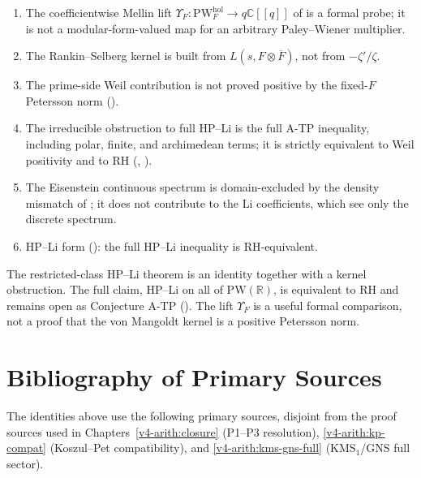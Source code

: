 \begin{enumerate}
\item The coefficientwise Mellin lift
\(\Upsilon_{F}\colon\mathrm{PW}^{\mathrm{hol}}_{F}\to q\mathbb C[[q]]\)
of  is a formal probe; it is not a
modular-form-valued map for an arbitrary Paley--Wiener multiplier.
\item The Rankin--Selberg kernel
 is built from
\(L(s,F\otimes\overline F)\), not from \(-\zeta'/\zeta\).
\item The prime-side Weil contribution is not proved positive by the
fixed-\(F\) Petersson norm
().
\item The irreducible obstruction to full HP--Li is the full A-TP
inequality, including polar, finite, and archimedean terms; it is
strictly equivalent to Weil positivity and to RH
(,
).
\item The Eisenstein continuous spectrum is domain-excluded by the
density mismatch of ; it
does not contribute to the Li coefficients, which see only the
discrete spectrum.
\item HP--Li form
(): the full HP--Li inequality is
RH-equivalent.
\end{enumerate}

\begin{remark}
\label{v4-arith:w5-a:rem:beilinson-principle}
The restricted-class HP--Li theorem is an identity together with a
kernel obstruction. The full claim, HP--Li on all of
\(\mathrm{PW}(\mathbb{R})\), is equivalent to RH and remains open as
Conjecture A-TP ().
The lift \(\Upsilon_F\) is a useful formal comparison, not a proof that
the von Mangoldt kernel is a positive Petersson norm.
\end{remark}

\section{Bibliography of Primary Sources}
\label{v4-arith:w5-a:bibliography}

The identities above use the following primary sources, disjoint from
the proof sources used in
Chapters~\ref{v4-arith:closure} (P1--P3 resolution),
\ref{v4-arith:kp-compat} (Koszul--Pet compatibility), and
\ref{v4-arith:kms-gns-full} (KMS\({}_{1}\)/GNS full sector).

